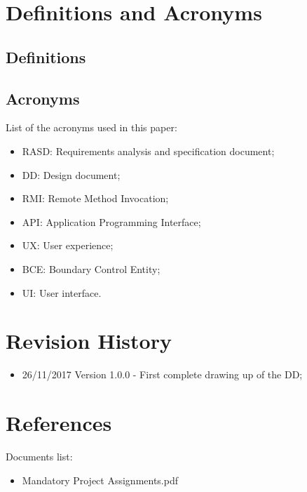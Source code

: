 \section{Definitions and Acronyms}
%
\subsection{Definitions}
\subsection{Acronyms}
List of the acronyms used in this paper:
\begin{itemize}
\item	RASD: Requirements analysis and specification document;
\item	DD: Design document;
\item	RMI: Remote Method Invocation;
\item	API: Application Programming Interface;
\item	UX: User experience;
\item	BCE: Boundary Control Entity;
\item	UI: User interface.
\end{itemize}
%
%
\section{Revision History}
\begin{itemize}
\item	26/11/2017 Version 1.0.0 - First complete drawing up of the DD;
\end{itemize}
%
%
\section{References}
Documents list:
\begin{itemize}
\item Mandatory Project Assignments.pdf
\end{itemize}
%
%
